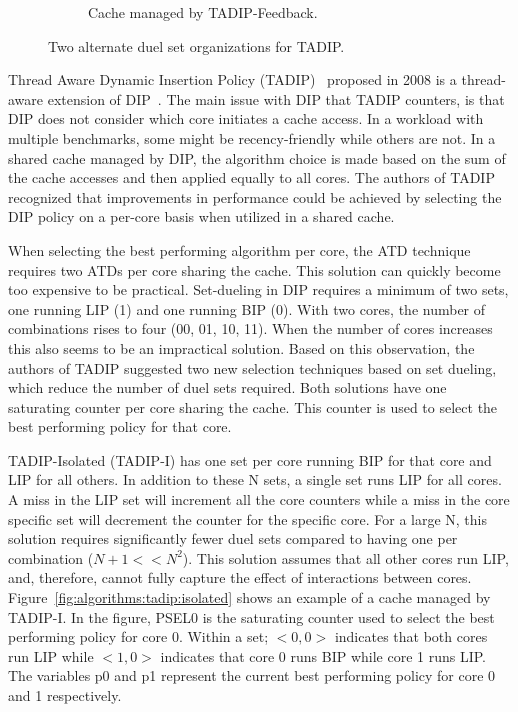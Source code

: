 \begin{figure}[H]
\begin{subfigure}[b]{0.5\textwidth}
        \caption{Cache managed by TADIP-Feedback.}
        \label{fig:algorithms:tadip:feedback}
    \end{subfigure}    
    \caption{Two alternate duel set organizations for TADIP.}
    \label{fig:algorithms:tadip}
\end{figure}

Thread Aware Dynamic Insertion Policy (TADIP)~\cite{Jaleel2008} proposed in 2008 is a thread-aware extension of DIP~\cite{Qureshi2007}.
The main issue with DIP that TADIP counters, is that DIP does not consider which core initiates a cache access.
In a workload with multiple benchmarks, some might be recency-friendly while others are not. 
In a shared cache managed by DIP, the algorithm choice is made based on the sum of the cache accesses and then applied equally to all cores.
The authors of TADIP recognized that improvements in performance could be achieved by selecting the DIP policy on a per-core basis when utilized in a shared cache.

When selecting the best performing algorithm per core, the ATD technique requires two ATDs per core sharing the cache. 
This solution can quickly become too expensive to be practical.
Set-dueling in DIP requires a minimum of two sets, one running LIP (1) and one running BIP (0). 
With two cores, the number of combinations rises to four (00, 01, 10, 11).
When the number of cores increases this also seems to be an impractical solution.
Based on this observation, the authors of TADIP suggested two new selection techniques based on set dueling, which reduce the number of duel sets required.
Both solutions have one saturating counter per core sharing the cache.
This counter is used to select the best performing policy for that core.

TADIP-Isolated (TADIP-I) has one set per core running BIP for that core and LIP for all others.
In addition to these N sets, a single set runs LIP for all cores. 
A miss in the LIP set will increment all the core counters while a miss in the core specific set will decrement the counter for the specific core.
For a large N, this solution requires significantly fewer duel sets compared to having one per combination ($N+1 << N^2$). 
This solution assumes that all other cores run LIP, and, therefore, cannot fully capture the effect of interactions between cores.
Figure~\ref{fig:algorithms:tadip:isolated} shows an example of a cache managed by TADIP-I. 
In the figure, PSEL0 is the saturating counter used to select the best performing policy for core 0.
Within a set; $<0, 0>$ indicates that both cores run LIP while $<1, 0>$ indicates that core 0 runs BIP while core 1 runs LIP.
The variables p0 and p1 represent the current best performing policy for core 0 and 1 respectively.

